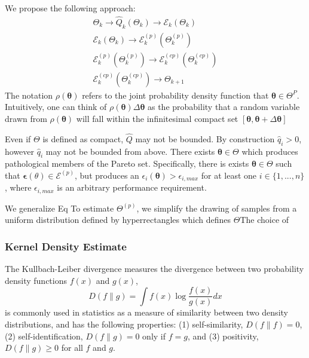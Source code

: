We propose the following approach:
\begin{subequations}
	\begin{gather}
	      \Theta_k \rightarrow \hat{Q}_k(\Theta_k) \rightarrow \mathcal{E}_k(\Theta_k) \\
	      \mathcal{E}_k(\Theta_k) \rightarrow \mathcal{E}_k^{(p)}(\Theta_k^{(p)}) \\
	      \mathcal{E}_k^{(p)}(\Theta_k^{(p)}) \rightarrow \mathcal{E}_k^{(cp)}(\Theta_k^{(cp)}) \\
	      \mathcal{E}_k^{(cp)}(\Theta_k^{(cp)}) \rightarrow \Theta_{k+1}
	\end{gather}
\end{subequations}
The notation $\rho(\bm{\theta})$ refers to the joint probability density function that $\bm{\theta} \in \Theta^{P}$.
Intuitively, one can think of
$\rho(\bm{\theta})\Delta\bm{\theta}$
as the probability that a random variable drawn from $\rho(\bm{\theta})$ will fall within the infinitesimal compact set $[\bm{\theta},\bm{\theta}+\Delta\bm{\theta}]$

Even if $\Theta$ is defined as compact, $\hat{Q}$ may not be bounded.  By construction $\hat{q}_i > 0 $, however $\hat{q}_i$ may not be bounded from above.  There exists $\bm{\theta} \in \Theta$ which produces pathological members of the Pareto set.  Specifically, there is exists $\bm{\theta} \in \Theta$ such that $\bm{\epsilon}(\theta) \in \mathcal{E}^(p)$, but produces an $\epsilon_i(\bm{\theta}) > \epsilon_{i,max}$ for at least one $i\in\{1,...,n\}$, where $\epsilon_{i,max}$ is an arbitrary performance requirement.

We generalize Eq
To estimate $\Theta^{(p)}$, we simplify the drawing of samples from a uniform distribution defined by hyperrectangles which defines $\Theta$The choice of
\subsubsection{Kernel Density Estimate}

The Kullbach-Leiber divergence\cite{kullback1951_kld} measures the divergence between two probability density functions $f(x)$ and $g(x)$,
\begin{equation}\label{eq:kld}
   D(f \parallel g) = \int f(x) \log \frac{f(x)}
                                          {g(x)} dx
\end{equation}
is commonly used in statistics as a measure of similarity between two density distributions, and has the following properties: (1) self-similarity, $D(f \parallel f) = 0$, (2) self-identification, $D(f \parallel g) = 0$ only if $f=g$, and (3) positivity, $D(f \parallel g) \geq 0$ for all $f$ and $g$.


